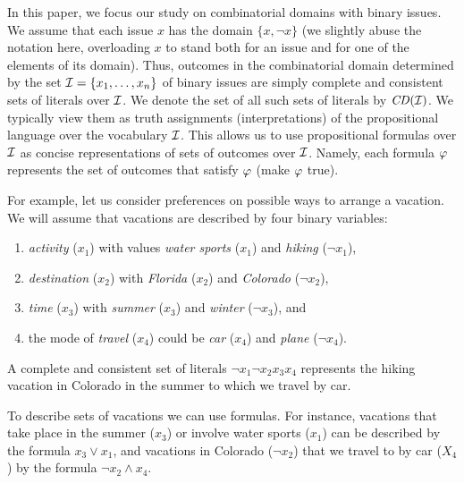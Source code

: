 In this paper, we focus our study on combinatorial domains with binary 
issues. We assume that each issue $x$ has the domain $\{x,\neg x\}$ 
(we slightly abuse the notation here, overloading $x$ to 
stand both for an issue and for one of the elements of its domain). 
Thus, outcomes in the combinatorial domain determined 
by the set $\mathcal{I}=\{x_1,\ldots,x_n\}$ of binary issues are simply complete
and consistent sets of literals over $\mathcal{I}$. We denote the set of all 
such sets of literals by $\mathit{CD}(\mathcal{I})$. We typically view them as truth 
assignments (interpretations) of the propositional language over the 
vocabulary $\mathcal{I}$. This allows us to use propositional formulas over 
$\mathcal{I}$ as concise representations of sets of outcomes over $\mathcal{I}$. Namely, 
each formula $\mathit{\varphi}$ represents the set of outcomes that satisfy $\mathit{\varphi}$ 
(make $\mathit{\varphi}$ true).

For example, let us consider preferences on possible ways to
arrange a vacation. We will assume that vacations are described by 
four binary variables: 
\begin{enumerate}  %
\item \textit{activity} ($x_1$) with values \textit{water sports} ($x_1$) and 
\textit{hiking} ($\neg x_1$),
\item \textit{destination} ($x_2$) with \textit{Florida} ($x_2$) and 
\textit{Colorado} ($\neg x_2$),
\item \textit{time} ($x_3$) with \textit{summer} ($x_3$) and 
\textit{winter} ($\neg x_3$), and
\item the mode of \textit{travel} ($x_4$) could be \textit{car} ($x_4$)
and \textit{plane} ($\neg x_4$).
\end{enumerate}
A complete and consistent set of literals $\neg x_1\neg x_2x_3x_4$
represents the hiking vacation in Colorado in the summer to which we travel
by car. 

To describe sets of vacations we can use formulas. For instance, 
vacations that take place in the summer ($x_3$) or involve water sports
($x_1$) can be described by the formula $x_3 \vee x_1$, and vacations 
in Colorado ($\neg x_2$) that we travel to by car ($X_4$) by the formula $\neg x_2
\wedge x_4$.

